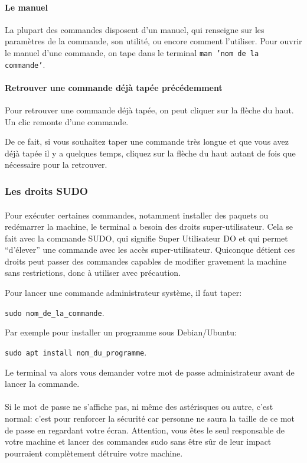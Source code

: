 \paragraph{Le manuel} La plupart des commandes disposent d'un manuel, qui
renseigne sur les paramètres de la commande, son utilité, ou encore comment
l'utiliser. Pour ouvrir le manuel d'une commande, on tape dans le terminal
\texttt{man 'nom de la commande'}.

\paragraph{Retrouver une commande déjà tapée précédemment} Pour retrouver une
commande déjà tapée, on peut cliquer sur la flèche du haut. Un clic remonte
d'une commande.

De ce fait, si vous souhaitez taper une commande très longue et que vous avez
déjà tapée il y a quelques temps, cliquez sur la flèche du haut autant de fois
que nécessaire pour la retrouver.

\subsubsection{Les droits SUDO}

\paragraph{} Pour exécuter certaines commandes, notamment installer des paquets
ou redémarrer la machine, le terminal a besoin des droits super-utilisateur.
Cela se fait avec la commande SUDO, qui signifie Super Utilisateur DO et qui
permet ``d'élever'' une commande avec les accès super-utilisateur. Quiconque
détient ces droits peut passer des commandes capables de modifier gravement la
machine sans restrictions, donc à utiliser avec précaution.

Pour lancer une commande administrateur système, il faut taper:

\texttt{sudo nom_de_la_commande}.

Par exemple pour installer un programme sous Debian/Ubuntu:

\texttt{sudo apt install nom_du_programme}.

Le terminal va alors vous demander votre mot de passe administrateur avant de
lancer la commande.

\paragraph{} Si le mot de passe ne s'affiche pas, ni même des astérisques ou
autre, c'est normal: c'est pour renforcer la sécurité car personne ne saura
la taille de ce mot de passe en regardant votre écran. Attention, vous êtes le
seul responsable de votre machine et lancer des commandes sudo sans être sûr de
leur impact pourraient complètement détruire votre machine.

